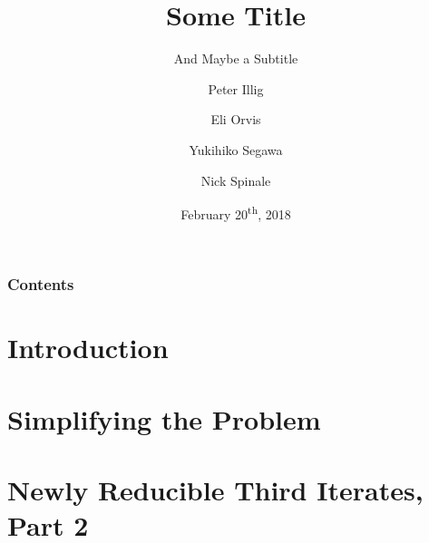 \documentclass{beamer}
\title{Some Title}
\subtitle{And Maybe a Subtitle}
\author[Illig \and Orvis \and Segawa \and Spinale]{Peter Illig \and Eli Orvis \and Yukihiko Segawa \and Nick Spinale}
\institute[Carleton]{Carleton College}
\date{February 20\textsuperscript{th}, 2018}
\begin{document}
\newtheorem{thm}{Theorem}[section]
\newtheorem{prop}[thm]{Proposition}
\newtheorem{cor}[thm]{Corollary}
\newtheorem{obs}[thm]{Observation}
\newtheorem{defn}[thm]{Definition}
\newtheorem{exmp}[thm]{Example}
\newtheorem{remk}[thm]{Remark}

\maketitle

\begin{frame}
  \frametitle{Contents}
  \tableofcontents
\end{frame}

\section{Introduction}



\section{Simplifying the Problem}




\section{Newly Reducible Third Iterates, Part 2}


\end{document}
